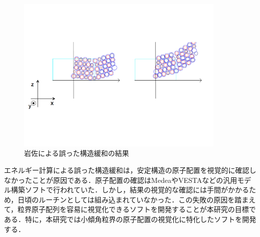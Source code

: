 \begin{figure}[htbp]\begin{center}
\includegraphics[width=10cm,bb= 0 0 737 553]{../figs/./boundary_narita.004.jpeg}
\caption{岩佐による誤った構造緩和の結果}
\label{default}\end{center}\end{figure}
エネルギー計算による誤った構造緩和は，安定構造の原子配置を視覚的に確認しなかったことが原因である．原子配置の確認はMedeaやVESTAなどの汎用モデル構築ソフトで行われていた．しかし，結果の視覚的な確認には手間がかかるため，日頃のルーチンとしては組み込まれていなかった．この失敗の原因を踏まえて，粒界原子配列を容易に視覚化できるソフトを開発することが本研究の目標である．特に，本研究では小傾角粒界の原子配置の視覚化に特化したソフトを開発する．

